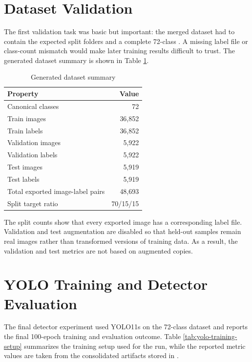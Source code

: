 \section{Dataset Validation}

The first validation task was basic but important: the merged dataset had to contain the expected split folders and a complete 72-class . A missing label file or class-count mismatch would make later training results difficult to trust. The generated dataset summary is shown in Table \ref{tab:generated-dataset-summary}.

\begin{table}[H]
\centering
\caption{Generated dataset summary}
\label{tab:generated-dataset-summary}
\begin{tabular}{lr}
\toprule
Property & Value\\
\midrule
Canonical classes & 72\\
Train images & 36,852\\
Train labels & 36,852\\
Validation images & 5,922\\
Validation labels & 5,922\\
Test images & 5,919\\
Test labels & 5,919\\
Total exported image-label pairs & 48,693\\
Split target ratio & 70/15/15\\
\bottomrule
\end{tabular}
\end{table}

The split counts show that every exported image has a corresponding label file. Validation and test augmentation are disabled so that held-out samples remain real images rather than transformed versions of training data. As a result, the validation and test metrics are not based on augmented copies.

\section{YOLO Training and Detector Evaluation}

The final detector experiment used YOLO11s on the 72-class dataset and reports the final 100-epoch training and evaluation outcome. Table \ref{tab:yolo-training-setup} summarizes the training setup used for the run, while the reported metric values are taken from the consolidated artifacts stored in .


